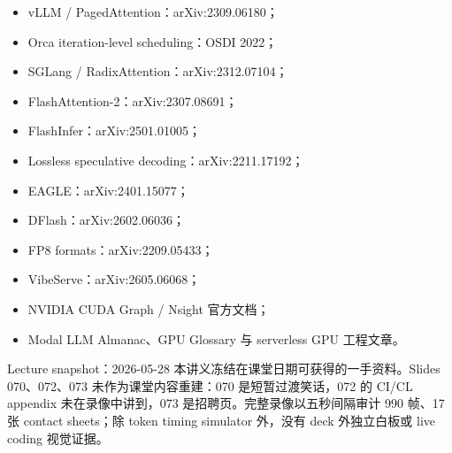 \documentclass[a4paper]{article}
\begin{document}
\begin{itemize}
  \item vLLM / PagedAttention：arXiv:2309.06180；
  \item Orca iteration-level scheduling：OSDI 2022；
  \item SGLang / RadixAttention：arXiv:2312.07104；
  \item FlashAttention-2：arXiv:2307.08691；
  \item FlashInfer：arXiv:2501.01005；
  \item Lossless speculative decoding：arXiv:2211.17192；
  \item EAGLE：arXiv:2401.15077；
  \item DFlash：arXiv:2602.06036；
  \item FP8 formats：arXiv:2209.05433；
  \item VibeServe：arXiv:2605.06068；
  \item NVIDIA CUDA Graph / Nsight 官方文档；
  \item Modal LLM Almanac、GPU Glossary 与 serverless GPU 工程文章。
\end{itemize}

\begin{knowledgebox}{Lecture snapshot：2026-05-28}
本讲义冻结在课堂日期可获得的一手资料。Slides 070、072、073 未作为课堂内容重建：070 是短暂过渡笑话，072 的 CI/CL appendix 未在录像中讲到，073 是招聘页。完整录像以五秒间隔审计 990 帧、17 张 contact sheets；除 token timing simulator 外，没有 deck 外独立白板或 live coding 视觉证据。
\end{knowledgebox}
\end{document}
